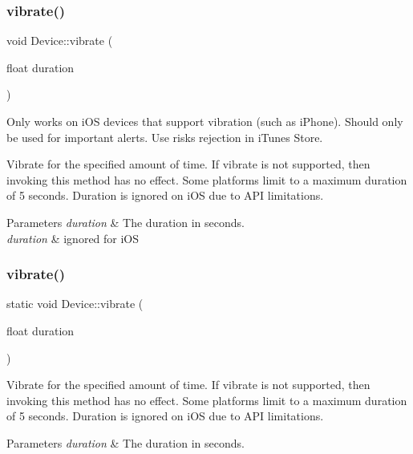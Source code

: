 \subsubsection{\texorpdfstring{vibrate()}{vibrate()}\hspace{0.1cm}{\footnotesize\ttfamily [1/2]}}
{\footnotesize\ttfamily void Device\+::vibrate (\begin{DoxyParamCaption}\item[{float}]{duration }\end{DoxyParamCaption})\hspace{0.3cm}{\ttfamily [static]}}



Only works on i\+OS devices that support vibration (such as i\+Phone). Should only be used for important alerts. Use risks rejection in i\+Tunes Store. 

Vibrate for the specified amount of time. If vibrate is not supported, then invoking this method has no effect. Some platforms limit to a maximum duration of 5 seconds. Duration is ignored on i\+OS due to A\+PI limitations. 
\begin{DoxyParams}{Parameters}
{\em duration} & The duration in seconds.\\
\hline
{\em duration} & ignored for i\+OS \\
\hline
\end{DoxyParams}
\mbox{\label{classDevice_ad8eae45743df465d662b63d2282c0ccd}} 
\subsubsection{\texorpdfstring{vibrate()}{vibrate()}\hspace{0.1cm}{\footnotesize\ttfamily [2/2]}}
{\footnotesize\ttfamily static void Device\+::vibrate (\begin{DoxyParamCaption}\item[{float}]{duration }\end{DoxyParamCaption})\hspace{0.3cm}{\ttfamily [static]}}

Vibrate for the specified amount of time. If vibrate is not supported, then invoking this method has no effect. Some platforms limit to a maximum duration of 5 seconds. Duration is ignored on i\+OS due to A\+PI limitations. 
\begin{DoxyParams}{Parameters}
{\em duration} & The duration in seconds. \\
\hline
\end{DoxyParams}


